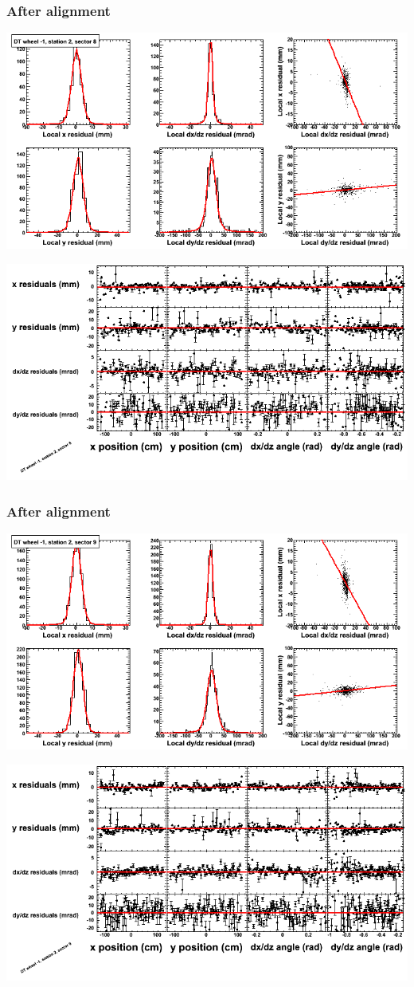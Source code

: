 \documentclass[compress]{beamer}
\begin{document}
\begin{frame}
\frametitle{After alignment}
\includegraphics[width=0.7\linewidth]{NOV4_fitfunctions/MBwhBst2sec08_bellcurves.png}

\includegraphics[width=0.7\linewidth]{NOV4_fitfunctions/MBwhBst2sec08_polynomials.png}
\end{frame}

\begin{frame}
\frametitle{After alignment}
\includegraphics[width=0.7\linewidth]{NOV4_fitfunctions/MBwhBst2sec09_bellcurves.png}

\includegraphics[width=0.7\linewidth]{NOV4_fitfunctions/MBwhBst2sec09_polynomials.png}
\end{frame}
\end{document}
